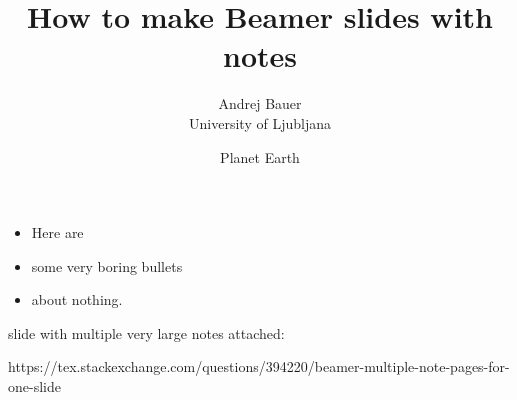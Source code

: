 \documentclass[12pt]{beamer}
\title{How to make Beamer slides with notes}
\author{Andrej Bauer\\University of Ljubljana}
\date{\small Planet Earth}
\begin{document}
\begin{frame}
  \titlepage

\end{frame}

\begin{frame}

  \begin{itemize}
  \item Here are
  \item some very boring bullets
  \item about nothing.
  \end{itemize}
  


  
\end{frame}

\begin{frame}

slide with multiple very large notes attached: 

https://tex.stackexchange.com/questions/394220/beamer-multiple-note-pages-for-one-slide



\end{frame}
\end{document}
